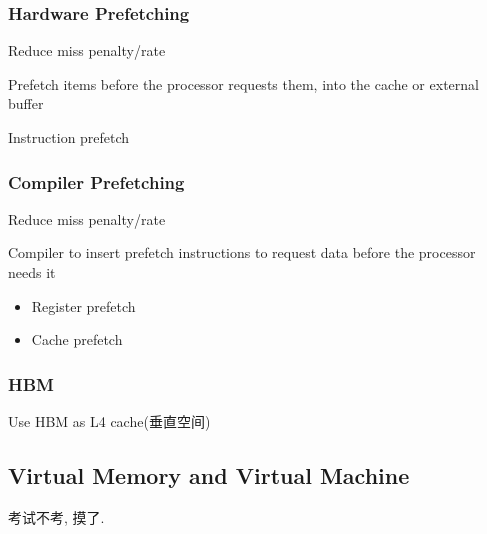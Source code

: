 \subsubsection{Hardware Prefetching}
Reduce miss penalty/rate

Prefetch items before the processor requests them, into the cache or external buffer

Instruction prefetch

\subsubsection{Compiler Prefetching}
Reduce miss penalty/rate

Compiler to insert prefetch instructions to request data before the processor needs it

\begin{itemize}
    \item Register prefetch
    \item Cache prefetch
\end{itemize}%

\subsubsection{HBM}
Use HBM as L4 cache(垂直空间)

\subsection{Virtual Memory and Virtual Machine}
考试不考, 摸了. %